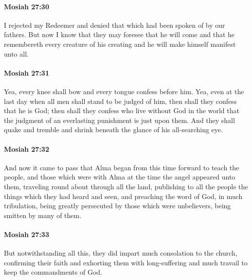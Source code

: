 		\paragraph{Mosiah 27:30} %
			\label{MOSIAH-27-30}

			I rejected my Redeemer
			and denied that which had been spoken of by our fathers.
			But now I know that they may foresee that he will come
			and that he remembereth every creature of his creating
			and he will make himself manifest unto all.

		\paragraph{Mosiah 27:31} %
			\label{MOSIAH-27-31}

			Yea, every knee shall bow and every tongue confess before him.
			Yea, even at the last day when all men shall stand to be judged of him,
			then shall they confess that he is God;
			then shall they confess who live without God in the world
			that the judgment of an everlasting punishment is just upon them.
			And they shall quake and tremble and shrink
			beneath the glance of his all-searching eye.

		\paragraph{Mosiah 27:32} %
			\label{MOSIAH-27-32}

			And now it came to pass that
			Alma began from this time forward to teach the people,
			and those which were with Alma at the time the angel appeared unto them,
			traveling round about through all the land,
			publishing to all the people the things which they had heard and seen,
			and preaching the word of God,
			in much tribulation,
			being greatly persecuted by those which were unbelievers,
			being smitten by many of them.

		\paragraph{Mosiah 27:33} %
			\label{MOSIAH-27-33}

			But notwithstanding all this, they did impart much consolation to the church,
			confirming their faith and exhorting them with long-suffering and much travail
			to keep the commandments of God.

